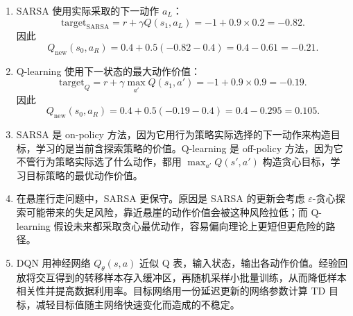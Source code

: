 \documentclass[UTF8,zihao=-4]{ctexart}
\begin{document}
\begin{enumerate}[label=(\arabic*)]
\item SARSA 使用实际采取的下一动作 $a_L$：
\[
\text{target}_{\mathrm{SARSA}}
=r+\gamma Q(s_1,a_L)
=-1+0.9\times 0.2=-0.82.
\]
因此
\[
Q_{\mathrm{new}}(s_0,a_R)
=0.4+0.5(-0.82-0.4)
=0.4-0.61=-0.21.
\]

\item Q-learning 使用下一状态的最大动作价值：
\[
\text{target}_{Q}
=r+\gamma \max_{a'}Q(s_1,a')
=-1+0.9\times 0.9=-0.19.
\]
因此
\[
Q_{\mathrm{new}}(s_0,a_R)
=0.4+0.5(-0.19-0.4)
=0.4-0.295=0.105.
\]

\item SARSA 是 on-policy 方法，因为它用行为策略实际选择的下一动作来构造目标，学习的是当前含探索策略的价值。Q-learning 是 off-policy 方法，因为它不管行为策略实际选了什么动作，都用 $\max_{a'}Q(s',a')$ 构造贪心目标，学习目标策略的最优动作价值。

\item 在悬崖行走问题中，SARSA 更保守。原因是 SARSA 的更新会考虑 $\varepsilon$-贪心探索可能带来的失足风险，靠近悬崖的动作价值会被这种风险拉低；而 Q-learning 假设未来都采取贪心最优动作，容易偏向理论上更短但更危险的路径。

\item DQN 用神经网络 $Q_\theta(s,a)$ 近似 Q 表，输入状态，输出各动作价值。经验回放将交互得到的转移样本存入缓冲区，再随机采样小批量训练，从而降低样本相关性并提高数据利用率。目标网络用一份延迟更新的网络参数计算 TD 目标，减轻目标值随主网络快速变化而造成的不稳定。
\end{enumerate}
\end{document}
